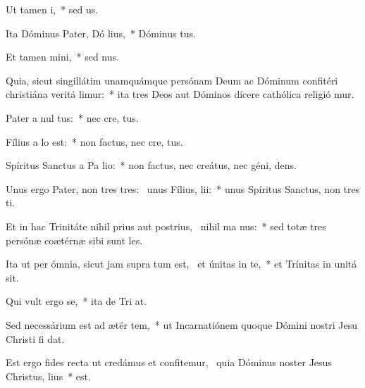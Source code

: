 \item Ut tamen   i,~* sed   us.
\item Ita Dóminus Pater, Dó lius,~* Dóminus  tus.
\item Et tamen   mini,~* sed   nus.
\item Quia, sicut singillátim unamquámque persónam Deum ac Dóminum confitéri christiána veritá limur:~* ita tres Deos aut Dóminos dícere cathólica religió mur.
\item Pater a nul  tus:~* nec cre,  tus.
\item Fílius a  lo est:~* non factus, nec cre,  tus.
\item Spíritus Sanctus a Pa  lio:~* non factus, nec creátus, nec géni,  dens.
\item Unus ergo Pater, non tres tres:~\pscross{} unus Fílius,   lii:~* unus Spíritus Sanctus, non tres  ti.
\item Et in hac Trinitáte nihil prius aut postrius,~\pscross{} nihil ma  nus:~* sed totæ tres persónæ coætérnæ sibi sunt  les.
\item Ita ut per ómnia, sicut jam supra tum est,~\pscross{} et únitas in te,~* et Trínitas in unitá  sit.
\item Qui vult ergo  se,~* ita de Tri at.
\item Sed necessárium est ad ætér tem,~* ut Incarnatiónem quoque Dómini nostri Jesu Christi fi dat.
\item Est ergo fides recta ut credámus et confitemur,~\pscross{} quia Dóminus noster Jesus Christus,  lius~*    est.

